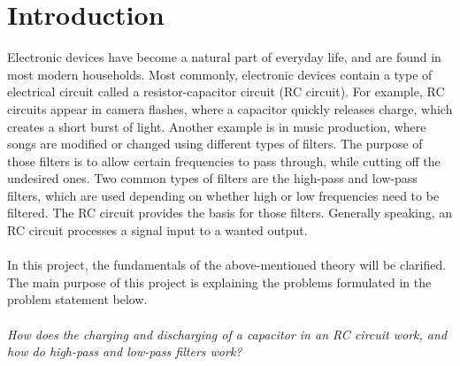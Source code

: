 \chapter{Introduction}
Electronic devices have become a natural part of everyday life, and are found in most modern households. Most commonly, electronic devices contain a type of electrical circuit called a resistor-capacitor circuit (RC circuit). For example, RC circuits appear in camera flashes, where a capacitor quickly releases charge, which creates a short burst of light. Another example is in music production, where songs are modified or changed using different types of filters. The purpose of those filters is to allow certain frequencies to pass through, while cutting off the undesired ones. Two common types of filters are the high-pass and low-pass filters, which are used depending on whether high or low frequencies need to be filtered. The RC circuit provides the basis for those filters. Generally speaking, an RC circuit processes a signal input to a wanted output. 
\\ \\
In this project, the fundamentals of the above-mentioned theory will be clarified. The main purpose of this project is explaining the problems formulated in the problem statement below.
\\ \\
\textit{How does the charging and discharging of a capacitor in an RC circuit work, and how do high-pass and low-pass filters work?}

